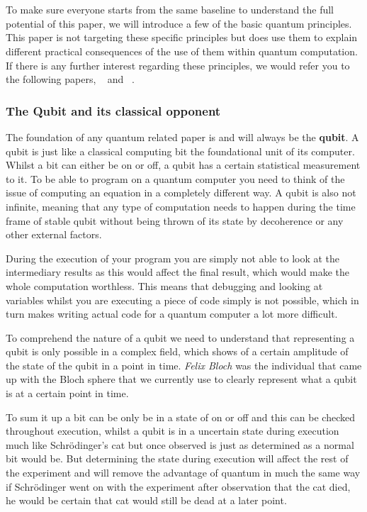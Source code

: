 \chapter{}
\label{ch:quantum-essentials}

To make sure everyone starts from the same baseline to understand the full potential of this paper, we will introduce a few of the basic quantum principles. This paper is not targeting these specific principles but does use them to explain different practical consequences of the use of them within quantum computation. If there is any further interest regarding these principles, we would refer you to the following papers, ~\textcite{Rieffel1998} and ~\textcite{Shor2000}.

\subsection{The Qubit and its classical opponent}

The foundation of any quantum related paper is and will always be the \textbf{qubit}. A qubit is just like a classical computing bit the foundational unit of its computer. Whilst a bit can either be on or off, a qubit has a certain statistical measurement to it. To be able to program on a quantum computer you need to think of the issue of computing an equation in a completely different way. A qubit is also not infinite, meaning that any type of computation needs to happen during the time frame of stable qubit without being thrown of its state by decoherence or any other external factors. 

During the execution of your program you are simply not able to look at the intermediary results as this would affect the final result, which would make the whole computation worthless. This means that debugging and looking at variables whilst you are executing a piece of code simply is not possible, which in turn makes writing actual code for a quantum computer a lot more difficult. 

To comprehend the nature of a qubit we need to understand that representing a qubit is only possible in a complex field, which shows of a certain amplitude of the state of the qubit in a point in time. \textit{Felix Bloch} was the individual that came up with the Bloch sphere that we currently use to clearly represent what a qubit is at a certain point in time. 

To sum it up a bit can be only be in a state of on or off and this can be checked throughout execution, whilst a qubit is in a uncertain state during execution much like Schrödinger's cat but once observed is just as determined as a normal bit would be. But determining the state during execution will affect the rest of the experiment and will remove the advantage of quantum in much the same way if Schrödinger went on with the experiment after observation that the cat died, he would be certain that cat would still be dead at a later point.

